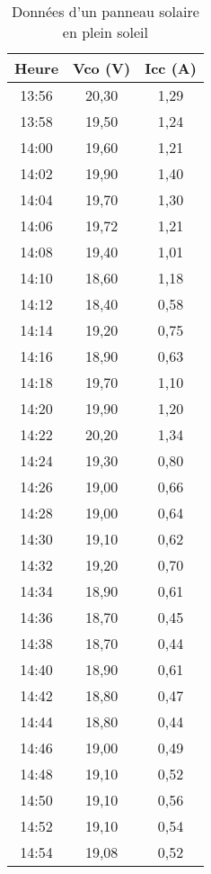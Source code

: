 \begin{table}[H]
	\centering
	\caption{Données d'un panneau solaire en plein soleil}
	\vspace{5mm}
	\begin{minipage}[t]{0.45\linewidth}
		\centering
		\begin{tabular}{|c|c|c|}
			\hline
			\textbf{Heure} & \textbf{Vco (V)} & \textbf{Icc (A)} \\
			\hline
			13:56 & 20,30 & 1,29 \\
			13:58 & 19,50 & 1,24 \\
			14:00 & 19,60 & 1,21 \\
			14:02 & 19,90 & 1,40 \\
			14:04 & 19,70 & 1,30 \\
			14:06 & 19,72 & 1,21 \\
			14:08 & 19,40 & 1,01 \\
			14:10 & 18,60 & 1,18 \\
			14:12 & 18,40 & 0,58 \\
			14:14 & 19,20 & 0,75 \\
			14:16 & 18,90 & 0,63 \\
			14:18 & 19,70 & 1,10 \\
			14:20 & 19,90 & 1,20 \\
			14:22 & 20,20 & 1,34 \\
			14:24 & 19,30 & 0,80 \\
			14:26 & 19,00 & 0,66 \\
			14:28 & 19,00 & 0,64 \\
			14:30 & 19,10 & 0,62 \\
			14:32 & 19,20 & 0,70 \\
			14:34 & 18,90 & 0,61 \\
			14:36 & 18,70 & 0,45 \\
			14:38 & 18,70 & 0,44 \\
			14:40 & 18,90 & 0,61 \\
			14:42 & 18,80 & 0,47 \\
			14:44 & 18,80 & 0,44 \\
			14:46 & 19,00 & 0,49 \\
			14:48 & 19,10 & 0,52 \\
			14:50 & 19,10 & 0,56 \\
			14:52 & 19,10 & 0,54 \\
			14:54 & 19,08 & 0,52 \\
			\hline
		\end{tabular}
	\end{minipage}
	\hfill
	\begin{minipage}[t]{0.45\linewidth}

\end{minipage}
\end{table}

